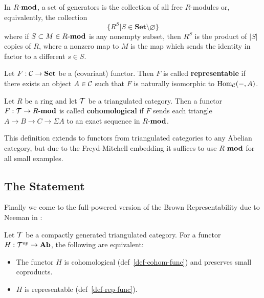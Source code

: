 \documentclass[12pt]{article}
\newcommand*{\Set}{\mathbf{Set}}
\begin{document}
\begin{ex}
	In $R\text{-}\mathbf{mod}$, a set of generators is the collection of all free $R$-modules or, equivalently, the collection 
	\[\{R^S|S\in\Set\setminus\varnothing\}\]
	where if $S\subset M\in R\text{-}\mathbf{mod}$ is any nonempty subset, then $R^S$ is the product of $|S|$ copies of $R$, 
	where a nonzero map to $M$ is the map which sends the identity in factor to a different $s\in S$.
\end{ex}
\begin{defn}\label{def-rep-func}
	Let $F:\mathcal{C}\to \mathbf{Set}$ be a (covariant) functor. Then $F$ is called \textbf{representable} if there exists an object $A\in \mathcal{C}$ such that
	$F$ is naturally isomorphic to $\operatorname{Hom}_{\mathcal{C}}(-,A)$.
\end{defn}
\begin{defn}\label{def-cohom-func}
	Let $R$ be a ring and let $\mathcal{T}$ be a triangulated category. Then a functor $F:\mathcal{T}\to R\text{-}\mathbf{mod}$ is called \textbf{cohomological}
	if $F$ sends each triangle $A\to B\to C\to\Sigma A$ to an exact sequence in $R\text{-}\mathbf{mod}$.
\end{defn}
\begin{rmk}
	This definition extends to functors from triangulated categories to any Abelian category, but due to the Freyd-Mitchell
	embedding it suffices to use $R\text{-}\mathbf{mod}$ for all small examples.
\end{rmk}


\subsection{The Statement}
Finally we come to the full-powered version of the Brown Representability due to Neeman in \cite{neeman-article}:
\begin{thm}[Brown]
	Let $\mathcal{T}$ be a compactly generated triangulated category. For a functor $H:\mathcal{T}^{op}\to\mathbf{Ab}$, the following 
	are equivalent:
	\begin{itemize}
		\item The functor $H$ is cohomological (def~\ref{def-cohom-func}) and preserves small coproducts.
		\item $H$ is representable (def~\ref{def-rep-func}).
	\end{itemize}
\end{thm}

\medskip

\printbibliography
\end{document}
